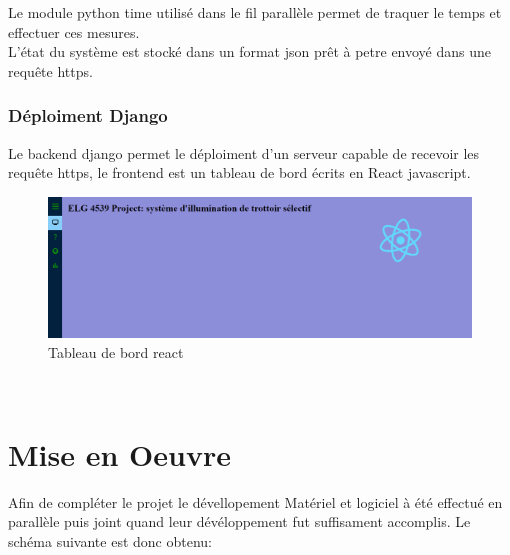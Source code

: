 \documentclass[journal]{IEEEtran}
\begin{document}
Le module python time utilisé dans le fil parallèle permet de traquer le temps et effectuer ces mesures.\\
L'état du système est stocké dans un format json prêt à petre envoyé dans une requête https.

\subsubsection{Déploiment Django}

Le backend django permet le déploiment d'un serveur capable de recevoir les requête https, le frontend est un tableau de bord écrits en React javascript.
\begin{figure}[htbp]
    \centerline{\includegraphics[scale = 0.18]{react_dashboard.PNG}}
    \caption{Tableau de bord react}
    \label{fig6}
\end{figure} 
\\

\section{Mise en Oeuvre}
Afin de compléter le projet le dévellopement Matériel et logiciel à été effectué en parallèle puis joint quand leur dévéloppement fut suffisament accomplis. Le schéma suivante
est donc obtenu:
\end{document}
